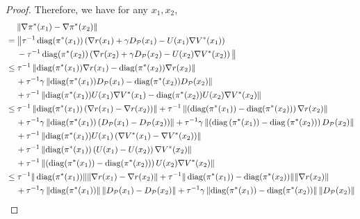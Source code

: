 \documentclass{article}
\theoremstyle{plain}
\theoremstyle{definition}
\theoremstyle{remark}
\def\cP{\mathcal P}
\DeclareMathOperator{\diag}{diag}
\begin{document}
\begin{proof}
    Therefore, we have for any $x_1,x_2$,
    \begin{align}
        & \quad\; \| \nabla \pi^*(x_1) - \nabla \pi^*(x_2) \| \notag \\
         & = \big\| \tau^{-1} \operatorname{diag}(\pi^*(x_1)) \left(\nabla r(x_1) + \gamma D_\cP(x_1) - U(x_1) \nabla V^*(x_1) \right) \notag \\
         & \quad \; - \tau^{-1} \operatorname{diag}(\pi^*(x_2)) \left(\nabla r(x_2) + \gamma D_\cP(x_2) - U(x_2) \nabla V^*(x_2) \right) \big\| \notag \\
         & \leq \tau^{-1} \left\| \diag(\pi^*(x_1)) \nabla r(x_1) - \diag(\pi^*(x_2)) \nabla r(x_2) \right\| \notag \\
         & \quad \, +  \tau^{-1} \gamma\left\| \diag(\pi^*(x_1)) D_\cP(x_1) - \diag(\pi^*(x_2)) D_\cP(x_2) \right\| \notag \\
         & \quad \, + \tau^{-1} \left\| \diag(\pi^*(x_1)) U(x_1) \nabla V^*(x_1) - \diag(\pi^*(x_2)) U(x_2) \nabla V^*(x_2) \right\| \notag\\
         & \leq \tau^{-1} \left\| \diag(\pi^*(x_1)) \left( \nabla r(x_1) - \nabla r(x_2) \right) \right\| + \tau^{-1} \left\| \left( \diag(\pi^*(x_1)) - \diag(\pi^*(x_2)) \right) \nabla r(x_2) \right\|\notag \\
         & \quad \, + \tau^{-1} \gamma \left\| \diag(\pi^*(x_1)) \left(D_\cP(x_1) - D_\cP(x_2) \right) \right\| + \tau^{-1} \gamma \left\| \left(\diag\left(\pi^*(x_1)\right) - \diag\left(\pi^*(x_2)\right)\right) D_{\cP}(x_2)  \right\|  \notag \\
         & \quad \,+ \tau^{-1} \left\| \diag(\pi^*(x_1)) U(x_1) \left( \nabla V^*(x_1) - \nabla V^*(x_2) \right) \right\| \notag\\
         & \quad \,+ \tau^{-1} \left\| \diag(\pi^*(x_1)) \left( U(x_1) - U(x_2) \right) \nabla V^*(x_2) \right\| \notag \\
         & \quad \,+ \tau^{-1} \left\| \left( \diag(\pi^*(x_1)) - \diag(\pi^*(x_2)) \right) U(x_2) \nabla V^*(x_2) \right\| \notag\\
         & \leq \tau^{-1} \|\diag(\pi^*(x_1)) \| \|\nabla r(x_1) - \nabla r(x_2) \| + \tau^{-1} \| \diag(\pi^*(x_1)) - \diag(\pi^*(x_2)) \| \| \nabla r(x_2) \| \notag\\
         & \quad \, + \tau^{-1} \gamma \left\| \diag(\pi^*(x_1))  \right\| \left\| D_\cP(x_1) - D_\cP(x_2) \right\| + \tau^{-1} \gamma \left\| \diag(\pi^*(x_1)) - \diag(\pi^*(x_2))\right\| \left\| D_{\cP}(x_2)  \right\|  \notag \\

\end{align}
\end{proof}
\end{document}
